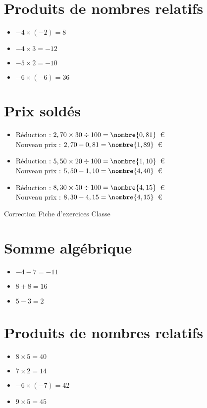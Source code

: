 \documentclass[a4paper,11pt,fleqn]{article}
\begin{document}
\section{Produits de nombres relatifs}
\begin{itemize}

  \item $-4\times(-2)=8$
  \item $-4\times3=-12$
  \item $-5\times2=-10$
  \item $-6\times(-6)=36$
\end{itemize}

\section{Prix soldés}
\begin{itemize}

  \item Réduction : $2,70\times30\div100=\nombre{0,81}$~€\\
  Nouveau prix : $2,70-0,81=\nombre{1,89}$~€
  \item Réduction : $5,50\times20\div100=\nombre{1,10}$~€\\
  Nouveau prix : $5,50-1,10=\nombre{4,40}$~€
  \item Réduction : $8,30\times50\div100=\nombre{4,15}$~€\\
  Nouveau prix : $8,30-4,15=\nombre{4,15}$~€
\end{itemize}
\newpage
\setcounter{exo}{0}
\setcounter{section}{0}
{Correction} \hfill {\huge Fiche d'exercices } \hfill {Classe}

\section{Somme algébrique}
\begin{itemize}

  \item $-4 -7=-11$
  \item $8 +8=16$
  \item $5 -3=2$
\end{itemize}

\section{Produits de nombres relatifs}
\begin{itemize}

  \item $8\times5=40$
  \item $7\times2=14$
  \item $-6\times(-7)=42$
  \item $9\times5=45$
\end{itemize}
\end{document}
